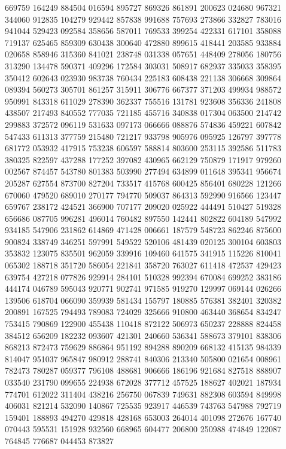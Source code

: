 {669759 164249 884504 016594 895727 869326 861891 200623 024680 967321 344060%
912835 104279 929442 857838 991688 757693 273866 332827 783016 941044 529423%
092584 358656 587011 769533 399254 422331 617101 358088 719137 625465 859309%
630438 300640 472880 899615 418441 203585 933884 020658 858946 315360 841021%
238748 031338 057651 448409 278056 180756 313290 134478 590371 409296 172584%
303031 508917 682937 335033 358395 350412 602643 023930 983738 760434 225183%
608438 221138 306668 309864 089394 560273 305701 861257 315911 306776 667377%
371203 499934 988572 950991 843318 611029 278390 362337 755516 131781 923608%
356336 241808 438507 217493 840552 777035 721185 455716 340838 017304 063500%
214742 299883 372572 096119 531633 097173 066666 088876 574836 459221 607842%
547433 611313 377759 215480 721217 933798 905976 095925 126797 397778 681772%
053932 417915 753238 606597 588814 803600 253115 392586 511783 380325 822597%
437288 177252 397082 430965 662129 750879 171917 979260 002567 874457 543780%
801383 503990 277494 634899 011648 395341 956674 205287 627554 873700 827204%
733517 415768 600425 856401 680228 121266 670060 479520 689010 270177 794770%
509037 864313 592990 916566 123447 659767 238172 424521 366900 707177 209020%
025922 444491 510427 519328 656686 087705 996281 496014 760482 897550 142441%
802822 604189 547992 934185 547906 231862 614869 471428 006661 187579 548723%
862246 875600 900824 338749 346251 597991 549522 520106 481439 020125 300104%
603803 353832 123075 835501 962059 339916 109460 641575 341915 115226 810041%
065302 188718 351720 586054 221841 358720 763027 611418 472537 429423 639754%
427218 077826 929914 284101 510328 992394 670084 699252 383186 444174 046789%
595043 920771 902741 971585 919270 129997 069144 026266 139506 618704 066090%
359939 581434 155797 180885 576381 382401 320382 200891 167525 794493 789083%
724029 325666 910800 463440 368654 834247 753415 790869 122900 455438 110418%
872122 506973 650237 228888 824458 384512 656209 182232 093607 421301 240660%
536341 588673 379101 838306 868213 872473 759629 886864 951192 894288 890209%
668132 415135 984339 814047 951037 965847 980912 288741 840306 213340 505800%
021654 008961 782473 780287 059377 796108 488681 906666 186196 921684 827518%
888907 033540 231790 099655 224938 672028 377712 457525 188627 402021 187934%
774701 612022 311404 438216 256750 067839 749631 882308 603594 849998 406031%
821214 532090 140867 725535 923917 446539 743763 547988 792719 159401 188893%
494270 429818 428168 653003 264014 401098 272676 167740 070443 595531 151928%
932560 668965 604477 206800 250988 474849 122087 764845 776687 044453 873827%
}
